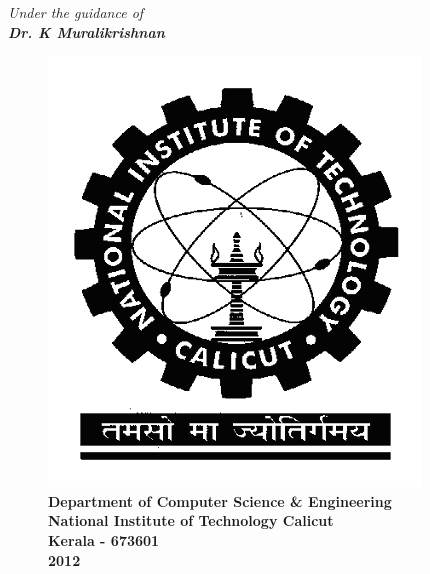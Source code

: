 \begin{center}
	\vspace{0.5cm}%
	\Large\it {Under the guidance of}\\%
	\vspace{0.3cm}%
	\normalfont\bf{Dr. K Muralikrishnan}\\%
	\vspace{1.5cm}%
	\begin{figure}[htp!]
	\begin{center}
	\includegraphics[scale=0.3]{pics/nitclogo}\\%
		\vspace{0.5cm}%
	\large\bf{Department of Computer Science \& Engineering}\\%
	\Large\bf{National Institute of Technology Calicut}\\%
	\small\bf{Kerala - 673601}\\%
            \small\bf{2012}\hspace*{\fill}\\%
	\end{center}
	\end{figure}
\end{center}%
